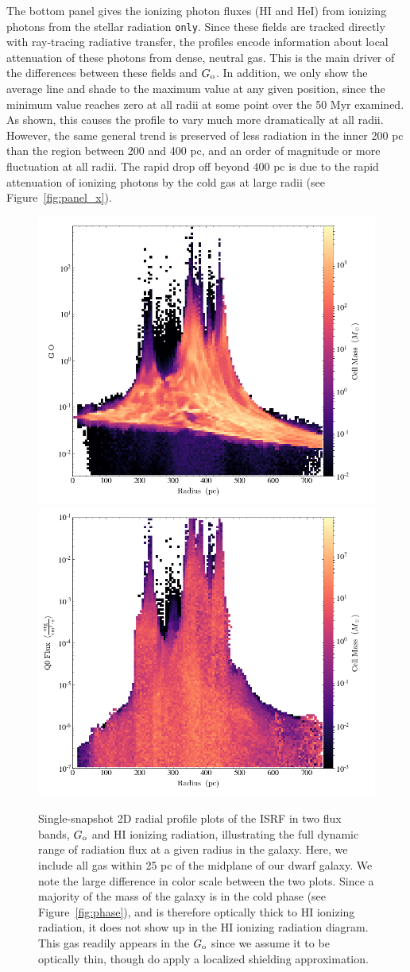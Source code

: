 \documentclass[twocolumn]{aastex61}
\begin{document}
The bottom panel gives the ionizing photon fluxes (HI and HeI) from ionizing photons from the stellar radiation \texttt{only}. Since these fields are tracked directly with ray-tracing radiative transfer, the profiles encode information about local attenuation of these photons from dense, neutral gas. This is the main driver of the differences between these fields and $G_{\rm o}$. In addition, we only show the average line and shade to the maximum value at any given position, since the minimum value reaches zero at all radii at some point over the 50 Myr examined. As shown, this causes the profile to vary much more dramatically at all radii. However, the same general trend is preserved of less radiation in the inner 200 pc than the region between 200 and 400 pc, and an order of magnitude or more fluctuation at all radii. The rapid drop off beyond 400 pc is due to the rapid attenuation of ionizing photons by the cold gas at large radii (see Figure~\ref{fig:panel_x}).

\begin{figure}
\centering
\includegraphics[width=0.45\linewidth]{g_o_2D_phase}
\includegraphics[width=0.45\linewidth]{q_o_2D_phase}
\caption{Single-snapshot 2D radial profile plots of the ISRF in two flux bands, $G_{\rm o}$ and HI ionizing radiation, illustrating the full dynamic range of radiation flux at a given radius in the galaxy. Here, we include all gas within 25 pc of the midplane of our dwarf galaxy. We note the large difference in color scale between the two plots. Since a majority of the mass of the galaxy is in the cold phase (see Figure~\ref{fig:phase}), and is therefore optically thick to HI ionizing radiation, it does not show up in the HI ionizing radiation diagram. This gas readily appears in the $G_{\rm o}$ since we assume it to be optically thin, though do apply a localized shielding approximation.}
\label{fig:ISRF_2D}
\end{figure}
\end{document}
